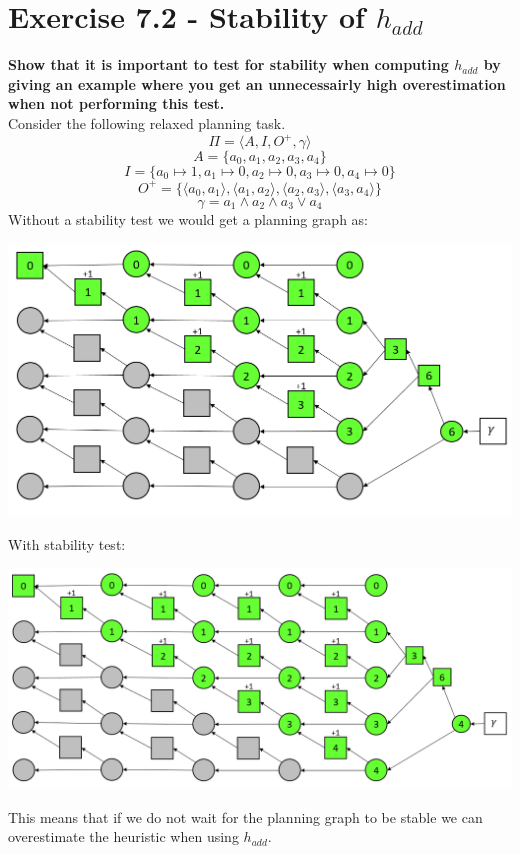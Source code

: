 \documentclass[12pt,a4paper]{article}
\begin{document}
\section*{Exercise 7.2 - Stability of $h_{add}$ }
\textbf{Show that it is important to test for stability when computing $h_{add}$
by giving an example where you get an unnecessairly high overestimation
when not performing this test.}\\
Consider the following relaxed planning task.\\
\[\Pi = \langle A, I, O^+, \gamma \rangle \]
\[A = \{a_0, a_1, a_2, a_3, a_4 \} \]
\[I = \{ a_0 \mapsto 1, a_1 \mapsto 0, a_2 \mapsto 0,
 a_3 \mapsto 0, a_4 \mapsto 0 \}\]
\[O^+ = \{ \langle a_0, a_1 \rangle, \langle a_1, a_2 \rangle ,
\langle a_2, a_3 \rangle, \langle a_3, a_4 \rangle\}\]
\[\gamma = a_1 \land a_2 \land a_3 \lor a_4 \]
Without a stability test we would get a planning graph as:\\
\begin{center}
	\includegraphics[scale=0.5]{stability_cond.png}\\
\end{center}

With stability test: \\
\begin{center}
	\includegraphics[scale=0.5]{without_stability.png}\\
\end{center}
This means that if we do not wait for the planning graph to be stable
we can overestimate the heuristic when using $h_{add}$.
\end{document}
